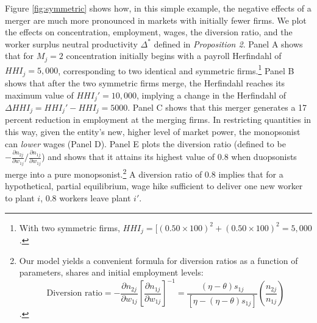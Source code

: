 \documentclass[12pt]{article}
\newcommand{\redSM}{\textcolor[rgb]{0.89,0.08,0.24}}    %
\theoremstyle{prop}
\begin{document}
Figure \ref{fig:symmetric} shows how, in this simple example, the negative effects of a merger are much more pronounced in markets with initially fewer firms. 
We plot the effects on concentration, employment, wages, the diversion ratio, and the worker surplus neutral  productivity $\Delta^*$ defined in \emph{Proposition 2}.
Panel A shows that for $M_j=2$ concentration initially begins with a payroll Herfindahl of  $HHI_j=5,000$, corresponding to two identical and symmetric firms.\footnote{
    With two symmetric firms, $HHI_j=[(0.50\times 100)^2+(0.50\times 100)^2=5,000$.} 
Panel B shows that after the two symmetric firms merge, the Herfindahl reaches its maximum value of $HHI_j'=10,000$, implying a change in the Herfindahl of $\Delta HHI_j = HHI_j'-HHI_j=5000$. 
Panel C shows that this merger generates a 17 percent reduction in employment at the merging firms. 
In restricting quantities in this way, given the entity's new, higher level of market power, the monopsonist can \textit{lower} wages (Panel D).   
Panel E plots the diversion ratio  (defined to be $-\frac{\partial n_{2j}}{\partial w_{1j}}/\frac{\partial n_{1j}}{\partial w_{1j}}$) and shows that it attains its highest value of 0.8 when duopsonists merge into a pure monopsonist.\footnote{Our model yields a convenient formula for diversion ratios as a function of parameters, shares and initial employment levels:
$$\text{Diversion ratio}=-\frac{\partial n_{2j}}{\partial w_{1j}}\left[\frac{\partial n_{1j}}{\partial w_{1j}}\right]^{-1}=\frac{\left(\eta-\theta\right)s_{1j}}{\left[\eta-\left(\eta-\theta\right)s_{1j}\right]}\left(\frac{n_{2j}}{n_{1j}}\right)$$.}  
A diversion ratio of 0.8 implies that for a hypothetical, partial equilibrium, wage hike sufficient to deliver one new worker to plant $i$, 0.8 workers leave plant $i'$. 

\end{document}
